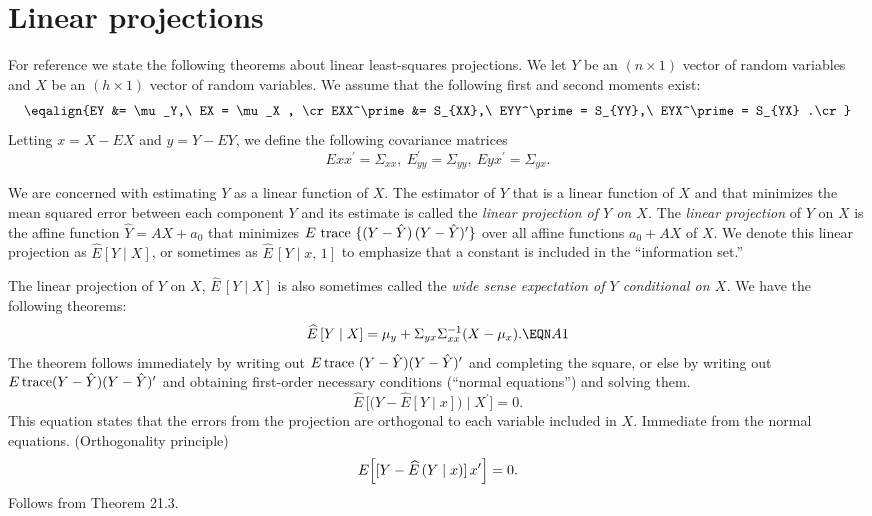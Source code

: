 \section{Linear projections} %

For reference we state the following theorems about linear least-squares
projections.  We let $Y$ be an $(n \times 1)$ vector of random variables and
$X$ be an $(h \times 1)$ vector of random variables.  We assume that the
following first and second moments exist:
$$\eqalign{EY &= \mu_Y,\ EX = \mu_X , \cr
EXX^\prime &= S_{XX},\ EYY^\prime = S_{YY},\ EYX^\prime = S_{YX} .\cr}$$
Letting $x=X - EX$ and $y = Y - EY$, we define the following covariance matrices
$$Exx^\prime = \Sigma_{xx},\ E_{yy}^\prime = \Sigma_{yy},\ Eyx^\prime =
\Sigma_{yx}.$$

We are concerned with estimating $Y$ as a linear function of $X$.  The
estimator of $Y$ that is a linear function of $X$ and that minimizes the
mean squared error between each component $Y$ and its estimate is called the
{\it linear projection of $Y$ on $X$.}
\medskip\noindent
 The {\it linear projection\/} of $Y$ on $X$ is the
affine
function $\hat Y = AX + a_0$ that minimizes $E\hbox{ trace } \{(Y-\hat Y)\,
(Y-\hat Y)^\prime\}$ over all affine functions $a_0+AX$ of $X$.  We denote
this linear
projection as $\widehat E [Y \mid X]$, or sometimes as $\widehat E\, [Y\mid x,
\, 1]$ to emphasize that
a constant is included in the ``information set.''
\enddefinition
\par
The linear projection of $Y$ on $X$, $\widehat E \, [Y \mid X]$ is also
sometimes called the {\it wide sense expectation of $Y$ conditional on $X$.}
We have the following theorems:
\medskip \noindent
$$\widehat E\,[Y \mid X] = \mu_y + \Sigma_{yx} \Sigma^{-1}_{xx} (X-\mu_x) .
\EQN A1$$
\endtheorem
\medskip \noindent
\proof
The theorem follows immediately by writing out $E\, {\rm trace}
\ (Y-\hat Y) (Y - \hat
Y)^\prime$ and completing the square, or else by writing out $E \, {\rm trace}
(Y-\hat Y) (Y - \hat Y)^\prime$ and obtaining first-order necessary conditions
(``normal equations'') and solving them. \endproof %
\medskip \noindent
$$\widehat E\,\biggl[\bigl(Y - \widehat E [Y \mid x]\bigr) \mid X^\prime
\biggr] = 0.$$
\endtheorem
\noindent This equation states that the errors from the projection are orthogonal to each
variable included in $X$.
\medskip\noindent
\proof Immediate from the normal equations.\endproof %
\medskip\noindent
 \quad (Orthogonality principle)
$$E\Bigl[ [Y-\widehat E\,(Y\mid x)]\,x^\prime\Bigr]=0 .$$
\endtheorem
\medskip\noindent
\proof Follows from Theorem 21.3. \endproof %


